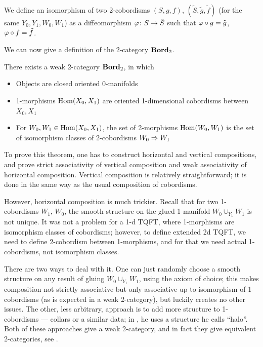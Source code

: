 We define an isomorphism of two 2-cobordisms $(S, g,f)$, $(\tilde S, \tilde
g, \tilde f)$ (for the same $Y_0,Y_1, W_0, W_1$) as a diffeomorphism $\varphi\colon
S\to \tilde S$ such that $\varphi\circ g = \tilde g$, $\varphi\circ f=\tilde f$.

We can now give a definition of the 2-category $\mathbf{Bord}_2$.

\begin{theorem}\label{t:bord2}
  There exists a weak 2-category $\mathbf{Bord}_2$, in which
  \begin{itemize}
    \item Objects are closed oriented $0$-manifolds
    \item 1-morphisms $\operatorname{Hom}(X_0, X_1)$ are oriented 1-dimensional cobordisms
      between $X_0, X_1$
    \item For $W_0, W_1\in \operatorname{Hom}(X_0, X_1)$, the set of 2-morphisms
       $\operatorname{Hom}(W_0,W_1)$ is the set of isomorphism classes of 2-cobordisms
       $W_0\Rightarrow W_1$
  \end{itemize}
\end{theorem}
To prove this theorem, one has to construct horizontal and vertical
compositions, and prove strict associativity of vertical composition and
weak associativity of horizontal composition. Vertical composition is
relatively straightforward; it is done in the same way as the usual
composition of cobordisms.

However, horizontal composition is much trickier. Recall that for two
1-cobordisms $W_1$, $W_0$, the smooth structure on the glued 1-manifold
$W_0\cup_{Y_1} W_1$ is not unique. It was not a problem for a 1-d TQFT, where
1-morphisms are isomorphism classes of cobordisms; however, to define extended
2d TQFT, we need to define 2-cobordism between 1-morphisms, and for that we
need actual 1-cobordisms, not isomorphism classes.

There are two ways to deal with it. One can just randomly choose a smooth
structure on any result of gluing $W_0\cup_{Y_1} W_1$, using the axiom of choice;
this makes composition not strictly associative but only associative up to
isomorphism of 1-cobordisms (as is expected in a weak 2-category), but luckily
creates no other issues. The other, less arbitrary, approach is to add more
structure to 1-cobordisms --- collars or a similar data; in
\cite{schommer-pries}, he uses a structure he calls ``halo''. Both of these
approaches give a weak 2-category, and in fact they give equivalent
2-categories, see \cite[Proposition 3.40]{schommer-pries}.

